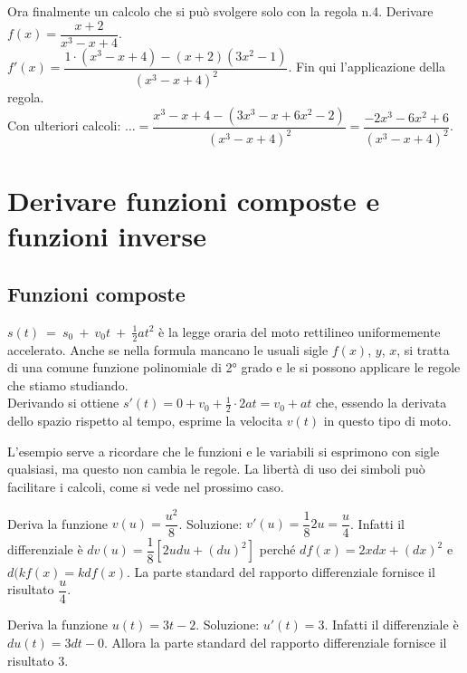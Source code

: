 \begin{esempio}
 Ora finalmente un calcolo che si può svolgere solo con la regola n.4.
 Derivare $f(x)= \dfrac{x+2}{x^3-x+4}$.\\
 $f'(x)=\dfrac{1\cdot(x^3-x+4)-(x+2)(3x^2-1)}{(x^3-x+4)^2}$. Fin qui 
 l'applicazione della regola. \\
 Con ulteriori calcoli:
 $\dots =\dfrac{x^3-x+4-(3x^3-x+6x^2-2)}{(x^3-x+4)^2}=
 \dfrac{-2x^3-6x^2+6}{(x^3-x+4)^2}$.\\
\end{esempio}


\section{Derivare funzioni composte e funzioni inverse}
\label{}
\subsection{Funzioni composte}
\label{subsec:diff01_dericomp}

\begin{esempio}
 $s(t)~=~s_0~+~v_0t~+~\frac{1}{2}at^2$ è la legge oraria del moto rettilineo
 uniformemente accelerato. Anche se nella formula mancano le usuali 
 sigle $f(x)$, $y$, $x$, si tratta di una comune funzione polinomiale
 di 2° grado e le si possono applicare le regole che stiamo studiando.\\
 Derivando si ottiene $s'(t)=0+v_0+\frac{1}{2}\cdot 2at=v_0+at$ 
che, essendo la derivata dello spazio rispetto al tempo, esprime la velocita 
$v(t)$ in questo tipo di moto.
\end{esempio}
L'esempio serve a ricordare che le funzioni e le variabili si esprimono con 
sigle qualsiasi, ma questo non cambia le regole. La libertà di uso dei simboli
può facilitare i calcoli, come si vede nel prossimo caso.
\begin{esempio}
  Deriva la funzione $v(u)=\dfrac{u^2}{8}$. 
  Soluzione: $v'(u)=\dfrac{1}{8}2u=\dfrac{u}{4}$. Infatti il differenziale è 
$dv(u)=\dfrac{1}{8}[2udu+(du)^2]$ perché $df(x)=2xdx+(dx)^2$ 
  e $d(kf(x)=kdf(x)$. La parte standard del rapporto differenziale fornisce
  il risultato $\dfrac{u}{4}$.
\end{esempio}

\begin{esempio}
Deriva la funzione $u(t)=3t-2$. Soluzione: $u'(t)=3$. Infatti il 
 differenziale è $du(t)=3dt-0$. Allora la parte 
 standard del rapporto differenziale fornisce il risultato $3$.
\end{esempio}

